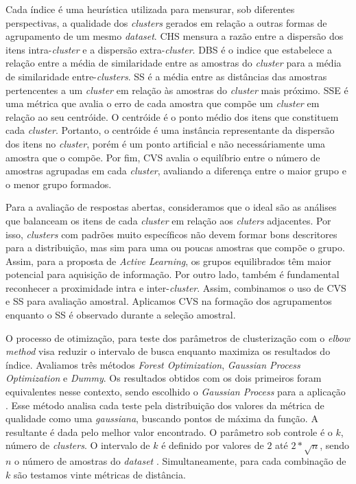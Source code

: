 Cada índice é uma heurística utilizada para mensurar, sob diferentes perspectivas, a qualidade dos \textit{clusters} gerados em relação a outras formas de agrupamento de um mesmo \textit{dataset}. CHS mensura a razão entre a dispersão dos itens intra-\textit{cluster} e a dispersão extra-\textit{cluster}. DBS é o indice que estabelece a relação entre a média de similaridade entre as amostras do \textit{cluster} para a média de similaridade entre-\textit{clusters}. SS é a média entre as distâncias das amostras pertencentes a um \textit{cluster} em relação às amostras do \textit{cluster} mais próximo. SSE é uma métrica que avalia o erro de cada amostra que compõe um \textit{cluster} em relação ao seu centróide. O centróide é o ponto médio dos itens que constituem cada \textit{cluster}. Portanto, o centróide é uma instância representante da dispersão dos itens no \textit{cluster}, porém é um ponto artificial e não necessáriamente uma amostra que o compõe. Por fim, CVS avalia o equilíbrio entre o número de amostras agrupadas em cada \textit{cluster}, avaliando a diferença entre o maior grupo e o menor grupo formados.

Para a avaliação de respostas abertas, consideramos que o ideal são as análises que balanceam os itens de cada \textit{cluster} em relação aos \textit{cluters} adjacentes. Por isso, \textit{clusters} com padrões muito específicos não devem formar bons descritores para a distribuição, mas sim para uma ou poucas amostras que compõe o grupo. Assim, para a proposta de \textit{Active Learning}, os grupos equilibrados têm maior potencial para aquisição de informação. Por outro lado, também é fundamental reconhecer a proximidade intra e inter-\textit{cluster}. Assim, combinamos o uso de CVS e SS para avaliação amostral. Aplicamos CVS na formação dos agrupamentos enquanto o SS é observado durante a seleção amostral.


O processo de otimização, para teste dos parâmetros de clusterização com o \textit{elbow method} visa reduzir o intervalo de busca enquanto maximiza os resultados do índice. Avaliamos três métodos \textit{Forest Optimization}, \textit{Gaussian Process Optimization} e \textit{Dummy}. Os resultados obtidos com os dois primeiros foram equivalentes nesse contexto, sendo escolhido o \textit{Gaussian Process} para a aplicação \cite{spalenza2019}. Esse método analisa cada teste pela distribuição dos valores da métrica de qualidade como uma \textit{gaussiana}, buscando pontos de máxima da função. A resultante é dada pelo melhor valor encontrado. O parâmetro sob controle é o $ k $, número de \textit{clusters}. O intervalo de $ k $ é definido por valores de $ 2 $ até $ 2 * \sqrt{n} $, sendo $ n $ o número de amostras do \textit{dataset} \cite{han2011}. Simultaneamente, para cada combinação de $ k $ são testamos vinte métricas de distância.


